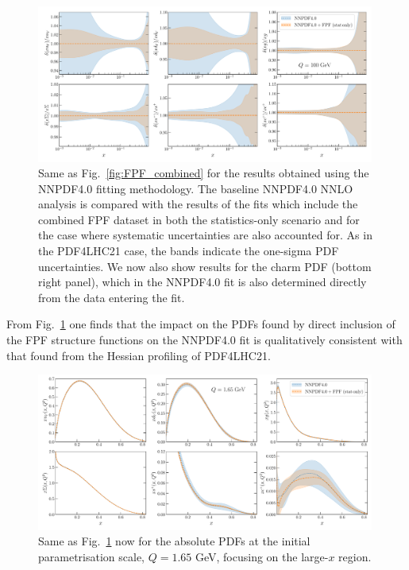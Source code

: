 \begin{figure}[t]
\centering
\includegraphics[width=0.99\textwidth]{plots/NNPDF40-FPFall-q100gev.pdf}
\caption{
  Same as Fig.~\ref{fig:FPF_combined} for the results obtained
  using the NNPDF4.0 fitting methodology.
  The baseline NNPDF4.0 NNLO analysis is compared
  with the results of the fits which include the combined FPF dataset
  in both the statistics-only scenario and for the case
  where systematic uncertainties are also accounted for.
  As in the PDF4LHC21 case, the bands indicate the one-sigma PDF uncertainties.
  We now also show results for the charm PDF (bottom right panel), which
  in the NNPDF4.0 fit is also determined directly from the data entering the fit.
%
}
\label{fig:NNPDF40_baseline}
\end{figure}

From  Fig.~\ref{fig:NNPDF40_baseline} one finds that
the impact on the PDFs found by direct inclusion of the FPF structure
functions on the NNPDF4.0 fit is qualitatively consistent with
that found from the Hessian profiling of PDF4LHC21.

\begin{figure}[t]
\centering
\includegraphics[width=0.99\textwidth]{plots/NNPDF40-FPFall-q1p65gev-abs.pdf}
\caption{
  Same as Fig.~\ref{fig:NNPDF40_baseline} now for the absolute PDFs
  at the initial parametrisation scale, $Q=1.65$ GeV, focusing
  on the large-$x$ region.
%
}
\label{fig:NNPDF40_lowQ_abs}
\end{figure}

